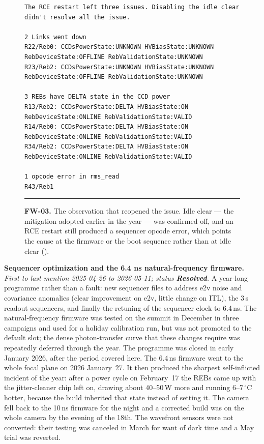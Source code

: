 \begin{description}
\begin{figure}[H]
\begin{minipage}{\textwidth}
\begin{verbatim}
The RCE restart left three issues. Disabling the idle clear didn't resolve all the issue.

2 Links went down
R22/Reb0: CCDsPowerState:UNKNOWN HVBiasState:UNKNOWN RebDeviceState:OFFLINE RebValidationState:UNKNOWN
R23/Reb2: CCDsPowerState:UNKNOWN HVBiasState:UNKNOWN RebDeviceState:OFFLINE RebValidationState:UNKNOWN

3 REBs have DELTA state in the CCD power
R13/Reb2: CCDsPowerState:DELTA HVBiasState:ON RebDeviceState:ONLINE RebValidationState:VALID
R14/Reb0: CCDsPowerState:DELTA HVBiasState:ON RebDeviceState:ONLINE RebValidationState:VALID
R34/Reb2: CCDsPowerState:DELTA HVBiasState:ON RebDeviceState:ONLINE RebValidationState:VALID

1 opcode error in rms_read
R43/Reb1
\end{verbatim}
\endgroup
\vspace{-10pt}\hrule
\end{minipage}
\caption{\textbf{FW-03.} The observation that reopened the issue.  Idle clear --- the mitigation adopted earlier in the year --- was confirmed off, and an RCE restart still produced a sequencer opcode error, which points the cause at the firmware or the boot sequence rather than at idle clear ().}
\label{fig:iss-FW-03}
\end{figure}

\item[FW-04]\label{iss:FW-04} \textbf{Sequencer optimization and the 6.4 ns natural-frequency firmware.}
  \emph{First to last mention 2025-04-26 to 2026-05-11; status \textcolor{stres}{\textbf{Resolved}}.}
  A year-long programme rather than a fault: new sequencer files to address e2v noise and covariance anomalies (clear improvement on e2v, little change on ITL), the 3\,s readout sequencers, and finally the retuning of the sequencer clock to 6.4\,ns.  The natural-frequency firmware was tested on the summit in December in three campaigns and used for a holiday calibration run, but was not promoted to the default slot; the dense photon-transfer curve that these changes require was repeatedly deferred through the year.  The programme was closed in early January 2026, after the period covered here.  The 6.4\,ns firmware went to the whole focal plane on 2026 January~27.  It then produced the sharpest self-inflicted incident of the year: after a power cycle on February~17 the REBs came up with the jitter-cleaner chip left on, drawing about 40--50\,W more and running 6--7\,$^{\circ}$C hotter, because the build inherited that state instead of setting it.  The camera fell back to the 10\,ns firmware for the night and a corrected build was on the whole camera by the evening of the 18th.  The wavefront sensors were not converted: their testing was canceled in March for want of dark time and a May trial was reverted.


\end{description}
